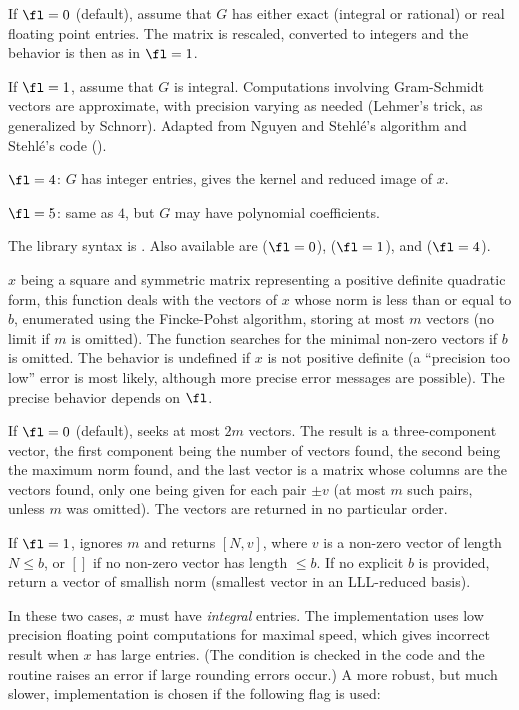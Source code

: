 If $\fl=0$ (default), assume that $G$ has either exact (integral or
rational) or real floating point entries. The matrix is rescaled, converted
to integers and the behavior is then as in $\fl = 1$.

If $\fl=1$, assume that $G$ is integral. Computations involving Gram-Schmidt
vectors are approximate, with precision varying as needed (Lehmer's trick,
as generalized by Schnorr). Adapted from Nguyen and Stehl\'e's algorithm
and Stehl\'e's code ().

$\fl=4$: $G$ has integer entries, gives the kernel and reduced image of $x$.

$\fl=5$: same as $4$, but $G$ may have polynomial coefficients.

The library syntax is .
Also available are  ($\fl=0$),
 ($\fl=1$), and 
($\fl=4$).

\label{se:qfminim}
$x$ being a square and symmetric matrix representing a positive definite
quadratic form, this function deals with the vectors of $x$ whose norm is
less than or equal to $b$, enumerated using the Fincke-Pohst algorithm,
storing at most $m$ vectors (no limit if $m$ is omitted). The function
searches for the minimal non-zero vectors if $b$ is omitted. The behavior is
undefined if $x$ is not positive definite (a ``precision too low'' error is
most likely, although more precise error messages are possible). The precise
behavior depends on $\fl$.

If $\fl=0$ (default), seeks at most $2m$ vectors. The result is a
three-component vector, the first component being the number of vectors
found, the second being the maximum norm found, and the last vector is a
matrix whose columns are the vectors found, only one being given for each
pair $\pm v$ (at most $m$ such pairs, unless $m$ was omitted). The vectors
are returned in no particular order.

If $\fl=1$, ignores $m$ and returns $[N,v]$, where $v$ is a non-zero vector
of length $N \leq b$, or $[]$ if no non-zero vector has length $\leq b$.
If no explicit $b$ is provided, return a vector of smallish norm
(smallest vector in an LLL-reduced basis).

In these two cases, $x$ must have \emph{integral} entries. The
implementation uses low precision floating point computations for maximal
speed, which gives incorrect result when $x$ has large entries. (The
condition is checked in the code and the routine raises an error if
large rounding errors occur.) A more robust, but much slower,
implementation is chosen if the following flag is used:

